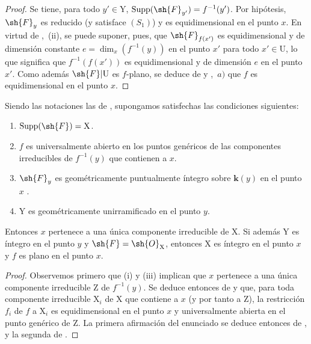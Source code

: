 \begin{proof}
\label{IV.15.3.2-proof}
Se tiene, para todo $y'\in\mathrm{Y}$, $\operatorname{Supp}(\sh{F}_{y'})=f^{-1}(y')$.
Por hipótesis, $\sh{F}_y$ es reducido (y satisface $(S_1)$) y es equidimensional en el punto $x$.
En virtud de ,~(ii), se puede suponer, pues, que $\sh{F}_{f(x')}$ es equidimensional y de dimensión constante $e=\dim_x(f^{-1}(y))$ en el punto $x'$ para todo $x'\in\mathrm{U}$, lo que significa que $f^{-1}(f(x'))$ es equidimensional y de dimensión $e$ en el punto $x'$.
Como además $\sh{F}|\mathrm{U}$ es $f$-plano, se deduce de  y ,~$a)$ que $f$ es equidimensional en el punto $x$.
\end{proof}

\begin{corollary}[15.3.3]
\label{IV.15.3.3}
Siendo las notaciones las de , supongamos satisfechas las condiciones siguientes:
\begin{enumerate}[label=\textup{(\roman*)}]
  \item $\operatorname{Supp}(\sh{F})=\mathrm{X}$.
  \item $f$ es universalmente abierto en los puntos genéricos de las componentes irreducibles de $f^{-1}(y)$ que contienen a $x$.
  \item $\sh{F}_y$ es geométricamente puntualmente íntegro sobre $\boldsymbol{k}(y)$ en el punto $x$ .
  \item $\mathrm{Y}$ es geométricamente unirramificado en el punto $y$.
\end{enumerate}
Entonces $x$ pertenece a una única componente irreducible de $\mathrm{X}$.
Si además $\mathrm{Y}$ es íntegro en el punto $y$ y $\sh{F}=\sh{O}_\mathrm{X}$, entonces $\mathrm{X}$ es íntegro en el punto $x$ y $f$ es plano en el punto $x$.
\end{corollary}

\begin{proof}
\label{IV.15.3.3-proof}
Observemos primero que (i) y (iii) implican que $x$ pertenece a una única componente irreducible $\mathrm{Z}$ de $f^{-1}(y)$.
Se deduce entonces de  y  que, para toda componente irreducible $\mathrm{X}_i$ de $\mathrm{X}$ que contiene a $x$ (y por tanto a $\mathrm{Z}$), la restricción $f_i$ de $f$ a $\mathrm{X}_i$ es equidimensional en el punto $x$ y universalmente abierta en el punto genérico de $\mathrm{Z}$.
La primera afirmación del enunciado se deduce entonces de , y la segunda de .
\end{proof}

